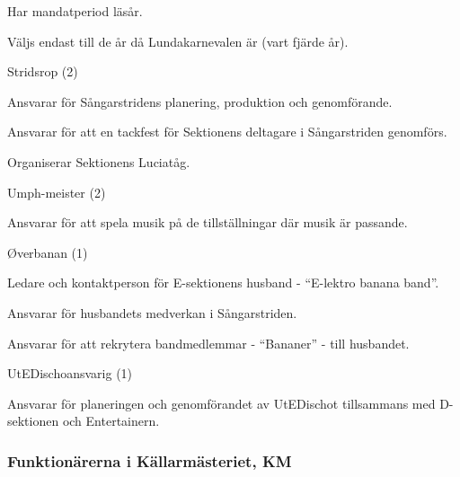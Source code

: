 \documentclass[10pt]{article}
\begin{document}
\begin{emptylist}
\begin{dashlist}
            \item Har mandatperiod läsår.
            \item Väljs endast till de år då Lundakarnevalen är (vart fjärde år).
        \end{dashlist}
    \item Stridsrop (2)
        \begin{dashlist}
            \item Ansvarar för Sångarstridens planering, produktion och genomförande.
            \item Ansvarar för att en tackfest för Sektionens deltagare i Sångarstriden genomförs.
            \item Organiserar Sektionens Luciatåg.
        \end{dashlist}
    \item Umph-meister (2)
        \begin{dashlist}
        \item Ansvarar för att spela musik på de tillställningar där musik är passande.
        \end{dashlist}
    \item Øverbanan (1)
        \begin{dashlist}
        \item Ledare och kontaktperson för E-sektionens husband - “E-lektro banana band”.
        \item Ansvarar för husbandets medverkan i Sångarstriden.
        \item Ansvarar för att rekrytera bandmedlemmar - “Bananer” - till husbandet.
        \end{dashlist}
    \item UtEDischoansvarig (1)
        \begin{dashlist}
        \item Ansvarar för planeringen och genomförandet av UtEDischot tillsammans med D-sektionen och Entertainern.
        \end{dashlist}
\end{emptylist}

\subsubsection{Funktionärerna i Källarmästeriet, KM}
\end{document}
